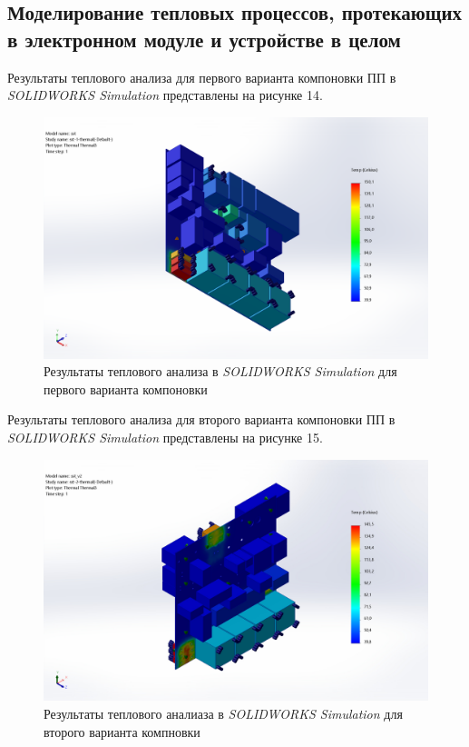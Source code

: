 \subsection{Моделирование тепловых процессов, протекающих в электронном модуле и устройстве в целом}

Результаты теплового анализа для первого варианта компоновки ПП
в \textit{SOLIDWORKS Simulation} представлены на рисунке 14.

\begin{figure}[H]
  \centering
  \includegraphics[scale=0.3]{../img/sst-1/thermal/top_view.png}
  \caption{Результаты теплового анализа в \textit{SOLIDWORKS Simulation}
    для первого варианта компоновки}
\end{figure}

Результаты теплового анализа для второго варианта компоновки ПП в
\textit{SOLIDWORKS Simulation} представлены на рисунке 15.

\begin{figure}[H]
  \centering
  \includegraphics[scale=0.3]{../img/sst-2/thermal/sst_v2-sst-2-thermal-Thermal-Thermal3.jpg}
  \caption{Результаты теплового аналиаза в \textit{SOLIDWORKS Simulation}
    для второго варианта компновки}
\end{figure}

